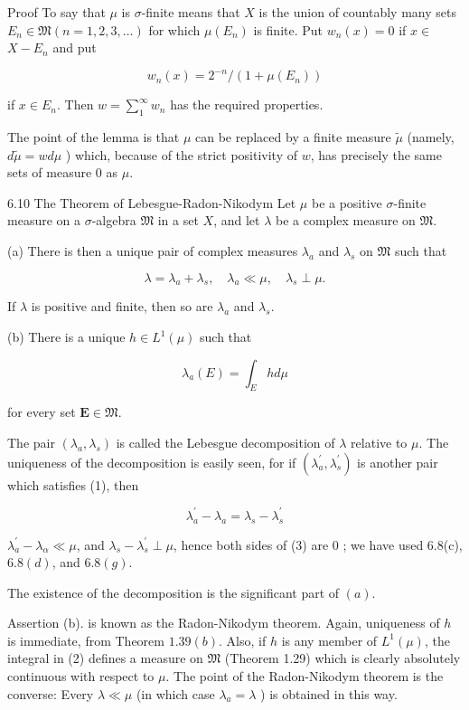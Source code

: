 \documentclass[10pt]{article}
\begin{document}
Proof To say that $\mu$ is $\sigma$-finite means that $X$ is the union of countably many sets $E_{n} \in \mathfrak{M}(n=1,2,3, \ldots)$ for which $\mu\left(E_{n}\right)$ is finite. Put $w_{n}(x)=0$ if $x \in$ $X-E_{n}$ and put

$$
w_{n}(x)=2^{-n} /\left(1+\mu\left(E_{n}\right)\right)
$$

if $x \in E_{n}$. Then $w=\sum_{1}^{\infty} w_{n}$ has the required properties.

The point of the lemma is that $\mu$ can be replaced by a finite measure $\tilde{\mu}$ (namely, $d \tilde{\mu}=w d \mu$ ) which, because of the strict positivity of $w$, has precisely the same sets of measure 0 as $\mu$.

6.10 The Theorem of Lebesgue-Radon-Nikodym Let $\mu$ be a positive $\sigma$-finite measure on a $\sigma$-algebra $\mathfrak{M}$ in a set $X$, and let $\lambda$ be a complex measure on $\mathfrak{M}$.

(a) There is then a unique pair of complex measures $\lambda_{a}$ and $\lambda_{s}$ on $\mathfrak{M}$ such that

$$
\lambda=\lambda_{a}+\lambda_{s}, \quad \lambda_{a} \ll \mu, \quad \lambda_{s} \perp \mu .
$$

If $\lambda$ is positive and finite, then so are $\lambda_{a}$ and $\lambda_{s}$.

(b) There is a unique $h \in L^{1}(\mu)$ such that

$$
\lambda_{a}(E)=\int_{E} h d \mu
$$

for every set $\boldsymbol{E} \in \mathfrak{M}$.

The pair $\left(\lambda_{a}, \lambda_{s}\right)$ is called the Lebesgue decomposition of $\lambda$ relative to $\mu$. The uniqueness of the decomposition is easily seen, for if $\left(\lambda_{a}^{\prime}, \lambda_{s}^{\prime}\right)$ is another pair which satisfies (1), then

$$
\lambda_{a}^{\prime}-\lambda_{a}=\lambda_{s}-\lambda_{s}^{\prime}
$$

$\lambda_{a}^{\prime}-\lambda_{\alpha} \ll \mu$, and $\lambda_{s}-\lambda_{s}^{\prime} \perp \mu$, hence both sides of (3) are 0 ; we have used 6.8(c), $6.8(d)$, and $6.8(g)$.

The existence of the decomposition is the significant part of $(a)$.

Assertion (b). is known as the Radon-Nikodym theorem. Again, uniqueness of $h$ is immediate, from Theorem $1.39(b)$. Also, if $h$ is any member of $L^{1}(\mu)$, the integral in (2) defines a measure on $\mathfrak{M}$ (Theorem 1.29) which is clearly absolutely continuous with respect to $\mu$. The point of the Radon-Nikodym theorem is the converse: Every $\lambda \ll \mu$ (in which case $\lambda_{a}=\lambda$ ) is obtained in this way.
\end{document}
